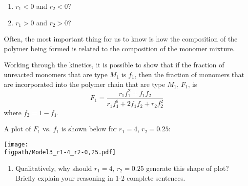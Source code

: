 \begin{activity}[Copolymerization]
\begin{ctqs}
\begin{enumerate}
				\begin{solution}[0.25in]
				\end{solution}
			
			\item $r_1 < 0$ and $r_2 < 0$?
			
				\begin{solution}[0.25in]
				\end{solution}
			
			\item $r_1 > 0$ and $r_2 > 0$?
			
				\begin{solution}[0.25in]
				\end{solution}
		\end{enumerate}

\end{ctqs}

\begin{model}
	\label{\labelbase:mdl:feedratios}
	
	Often, the most important thing for us to know is how the composition of the polymer being formed is related to the composition of the monomer mixture.
	
	Working through the kinetics, it is possible to show that if the fraction of unreacted monomers that are type $M_1$ is $f_1$, then the fraction of monomers that are incorporated into the polymer chain that are type $M_1$, $F_1$, is
	\begin{equation*}
		F_1 = \frac{r_1f_1^2 + f_1f_2}{r_1f_1^2+2f_1f_2 + r_2f_2^2}
	\end{equation*}
	where $f_2 = 1-f_1$.

\end{model}

\begin{ctqs}
	\question A plot of $F_1$ vs. $f_1$ is shown below for $r_1 = 4$, $r_2=0.25$: \label{\labelbase:ctq:feedratplot}
	
		\centerline{\texttt{[image: \\figpath/Model3\_r1-4\_r2-0,25.pdf]}}
	
		\begin{enumerate}
			\item Qualitatively, why should $r_1 = 4$, $r_2=0.25$ generate this shape of plot?  Briefly explain your reasoning in 1-2 complete sentences.
				
				\begin{solution}[1.5in]
				\end{solution}
			

\end{enumerate}
\end{ctqs}
\end{activity}
